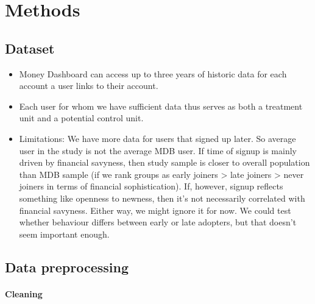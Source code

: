 
\section{Methods}%
\label{sec:data}

\subsection{Dataset}%
\label{sub:dataset}

\begin{itemize}

    \item Money Dashboard can access up to three years of historic data for
        each account a user links to their account.

    \item Each user for whom we have sufficient data thus serves as both a
        treatment unit and a potential control unit.

    \item Limitations: We have more data for users that signed up later. So average user in
        the study is not the average MDB user. If time of signup is mainly
        driven by financial savyness, then study sample is closer to overall
        population than MDB sample (if we rank groups as early joiners > late
        joiners > never joiners in terms of financial sophistication). If,
        however, signup reflects something like openness to newness, then it's
        not necessarily correlated with financial savyness. Either way, we
        might ignore it for now. We could test whether behaviour differs
        between early or late adopters, but that doesn't seem important enough.

\end{itemize}

\subsection{Data preprocessing}%
\label{sub:data_preprocessing}

\paragraph{Cleaning}%
\label{par:cleaning}

